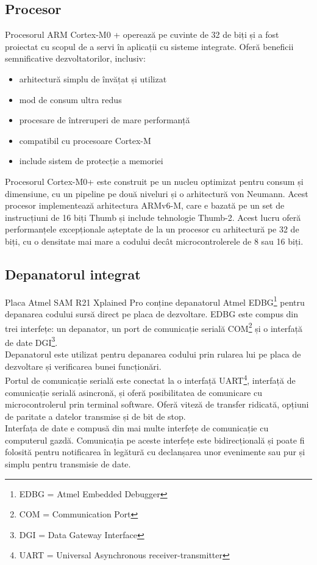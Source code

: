 \documentclass[12pt,a4paper]{report}
\begin{document}
\subsection{Procesor}
Procesorul ARM Cortex-M0 + operează pe cuvinte de 32 de biți și a fost proiectat cu scopul de a servi în aplicații cu sisteme integrate\cite{cpu}. Oferă beneficii semnificative dezvoltatorilor, inclusiv:
\begin{itemize}
	\item{arhitectură simplu de învățat și utilizat}
	\item{mod de consum ultra redus}
	\item{procesare de întreruperi de mare performanță}
	\item{compatibil cu procesoare Cortex-M}
	\item{include sistem de protecție a memoriei}
\end{itemize}
Procesorul Cortex-M0+ este construit pe un nucleu optimizat pentru consum și dimensiune, cu un pipeline pe două niveluri și o arhitectură von Neumann.
Acest procesor implementează arhitectura ARMv6-M, care e bazată pe un set de instrucțiuni de 16 biți Thumb și include tehnologie Thumb-2. Acest lucru oferă performanțele excepționale așteptate de la un procesor cu arhitectură pe 32 de biți, cu o densitate mai mare a codului decât microcontrolerele de 8 sau 16 biți.

\subsection{Depanatorul integrat}
Placa Atmel SAM R21 Xplained Pro conține depanatorul Atmel EDBG\footnote{EDBG = Atmel Embedded Debugger} pentru depanarea codului sursă direct pe placa de dezvoltare. EDBG este compus din trei interfețe: un depanator, un port de comunicație serială COM\footnote{COM = Communication Port} și o interfață de date DGI\footnote{DGI = Data Gateway Interface}.\\
Depanatorul este utilizat pentru depanarea codului prin rularea lui pe placa de dezvoltare și verificarea bunei funcționări.\\
Portul de comunicație serială este conectat la o interfață UART\footnote{UART = Universal Asynchronous receiver-transmitter}, interfață de comunicație serială asincronă, și oferă posibilitatea de comunicare cu microcontrolerul prin terminal software. Oferă viteză de transfer ridicată, opțiuni de paritate a datelor transmise și de bit de stop.\\
Interfața de date e compusă din mai multe interfețe de comunicație cu computerul gazdă. Comunicația pe aceste interfețe este bidirecțională și poate fi folosită pentru notificarea în legătură cu declanșarea unor evenimente sau pur și simplu pentru transmisie de date.
\end{document}
